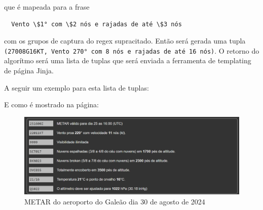 que é mapeada para a frase

\begin{verbatim}
  Vento \$1° com \$2 nós e rajadas de até \$3 nós
\end{verbatim}

com os grupos de captura do regex supracitado. Então será gerada uma tupla
\texttt{(27008G16KT, Vento 270° com 8 nós e rajadas de até 16 nós)}. O retorno do 
algorítmo será uma lista de tuplas que será enviada a ferramenta de templating
de página Jinja.

A seguir um exemplo para esta lista de tuplas:



E como é mostrado na página:

\begin{figure}[ht]
  \begin{center}
  \includegraphics[width=400pt]{img/metar-sbgl.png}
  \caption{METAR do aeroporto do Galeão dia 30 de agosto de 2024}
  \label{fig:metar-30-08}
  \end{center}
\end{figure}
